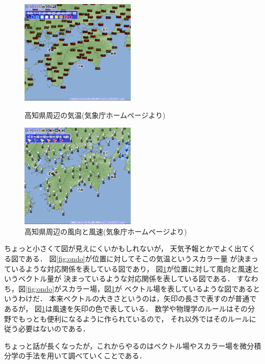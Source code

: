 \begin{figure}[h]
 \begin{minipage}{0.5\hsize}
  \begin{center}
   \includegraphics[width=5.5cm]{picture/vecterana1}
  \end{center}
 \caption{高知県周辺の気温(気象庁ホームページより)}
 \label{fig:ondo}
\end{minipage}
\begin{minipage}{0.5\hsize}
  \begin{center}
   \includegraphics[width=5.5cm]{picture/vecterana2}
  \end{center}
 \caption{高知県周辺の風向と風速(気象庁ホームページより)}
 \label{fig:husoku}
\end{minipage}
\end{figure} 
ちょっと小さくて図が見えにくいかもしれないが，
天気予報とかでよく出てくる図である．
図\ref{fig:ondo}が位置に対してそこの気温というスカラー量
が決まっているような対応関係を表している図であり，
図\ref{fig:husoku}が位置に対して風向と風速というベクトル量が
決まっているような対応関係を表している図である．
すなわち，図\ref{fig:ondo}がスカラー場，図\ref{fig:husoku}が
ベクトル場を表しているような図であるというわけだ．
本来ベクトルの大きさというのは，矢印の長さで表すのが普通であるが，
図\ref{fig:husoku}は風速を矢印の色で表している．
数学や物理学のルールはその分野でもっとも便利になるように作られているので，
それ以外ではそのルールに従う必要はないのである．

ちょっと話が長くなったが，これからやるのはベクトル場やスカラー場を微分積分学の手法を用いて調べていくことである．


